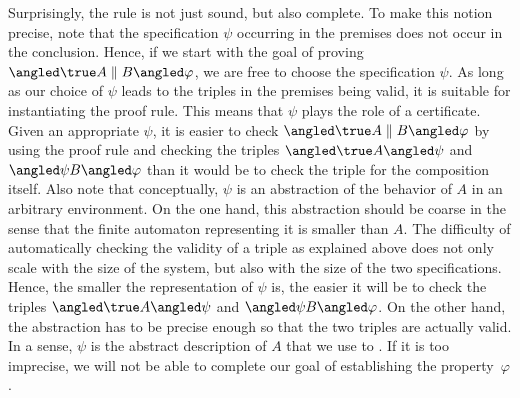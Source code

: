 \documentclass[../../diss.tex]{subfiles}
\begin{document}
Surprisingly, the rule is not just sound, but also complete.
To make this notion precise, note that the specification $\psi$ occurring in the premises does not occur in the conclusion.
Hence, if we start with the goal of proving $\agtriple{\true}{A \parcomp B}{\varphi}$, we are free to choose the specification $\psi$.
As long as our choice of $\psi$ leads to the triples in the premises being valid, it is suitable for instantiating the proof rule.
This means that $\psi$ plays the role of a certificate.
Given an appropriate $\psi$, it is easier to check $\agtriple{\true}{A \parcomp B}{\varphi}$ by using the proof rule and checking the triples $\agtriple{\true}{A}{\psi}$ and $\agtriple{\psi}{B}{\varphi}$ than it would be to check the triple for the composition itself.
Also note that conceptually, $\psi$ is an abstraction of the behavior of $A$ in an arbitrary environment.
On the one hand, this abstraction should be coarse in the sense that the finite automaton representing it is smaller than $A$.
The difficulty of automatically checking the validity of a triple as explained above does not only scale with the size of the system, but also with the size of the two specifications.
Hence, the smaller the representation of $\psi$ is, the easier it will be to check the triples $\agtriple{\true}{A}{\psi}$ and $\agtriple{\psi}{B}{\varphi}$.
On the other hand, the abstraction has to be precise enough so that the two triples are actually valid.
In a sense, $\psi$ is the abstract description of $A$ that we use to .
If it is too imprecise, we will not be able to complete our goal of establishing the property~$\varphi$.
\end{document}
